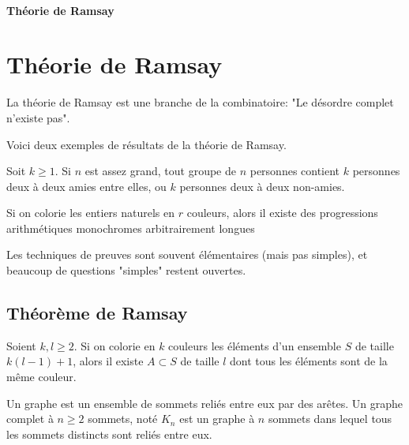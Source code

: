 \ifsolo
    ~

    \vspace{1cm}

    \begin{center}
        \textbf{\LARGE Théorie de Ramsay} \\[1em]
    \end{center}
    \tableofcontents
\else
    \chapter{Théorie de Ramsay}

    \minitoc
\fi
\thispagestyle{empty}

La théorie de Ramsay est une branche de la combinatoire: "Le désordre complet n'existe pas".

Voici deux exemples de résultats de la théorie de Ramsay.

\begin{thm}[Ramsay]
Soit $k\geq 1$. Si $n$ est assez grand, tout groupe de $n$ personnes contient  $k$ personnes deux à deux amies entre elles, ou $k$ personnes deux à deux non-amies.
\end{thm}

\begin{thm}
Si on colorie les entiers naturels en $r$ couleurs, alors il existe des progressions arithmétiques monochromes arbitrairement longues
\end{thm}

Les techniques de preuves sont souvent élémentaires (mais pas simples), et beaucoup de questions "simples" restent ouvertes.

\section{Théorème de Ramsay}

\begin{thm}
    Soient $k,l\geq 2$. Si on colorie en $k$ couleurs les éléments d'un ensemble $S$ de taille $k(l-1)+1$, alors il existe  $A\subset S$ de taille  $l$ dont tous les éléments sont de la même couleur.
\end{thm}

\begin{dfn}[Graphe]
    Un graphe  est un ensemble de sommets reliés entre eux par des arêtes. Un graphe complet à $n\geq 2$ sommets, noté $K_n$ est un graphe à  $n$ sommets dans lequel tous les sommets distincts sont reliés entre eux.
\end{dfn}

